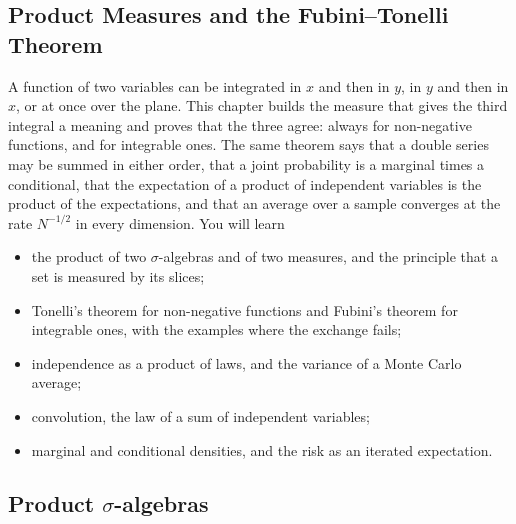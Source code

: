 \begin{notechapter}
\chapter{Product Measures and the Fubini--Tonelli Theorem}
\label{ch:fubini}

\begin{chapterintro}
A function of two variables can be integrated in $x$ and then in $y$,
in $y$ and then in $x$, or at once over the plane. This chapter builds
the measure that gives the third integral a meaning and proves that the
three agree: always for non-negative functions, and for integrable ones.
The same theorem says that a double series may be summed in either
order, that a joint probability is a marginal times a conditional, that
the expectation of a product of independent variables is the product of
the expectations, and that an average over a sample converges at the
rate $N^{-1/2}$ in every dimension. You will learn
\begin{itemize}[nosep]
  \item the product of two $\sigma$-algebras and of two measures, and
        the principle that a set is measured by its slices;
  \item Tonelli's theorem for non-negative functions and Fubini's
        theorem for integrable ones, with the examples where the
        exchange fails;
  \item independence as a product of laws, and the variance of a
        Monte Carlo average;
  \item convolution, the law of a sum of independent variables;
  \item marginal and conditional densities, and the risk as an iterated
        expectation.
\end{itemize}
\end{chapterintro}

\section{Product $\sigma$-algebras}\label{fubini:sec:sigma}


\end{notechapter}
